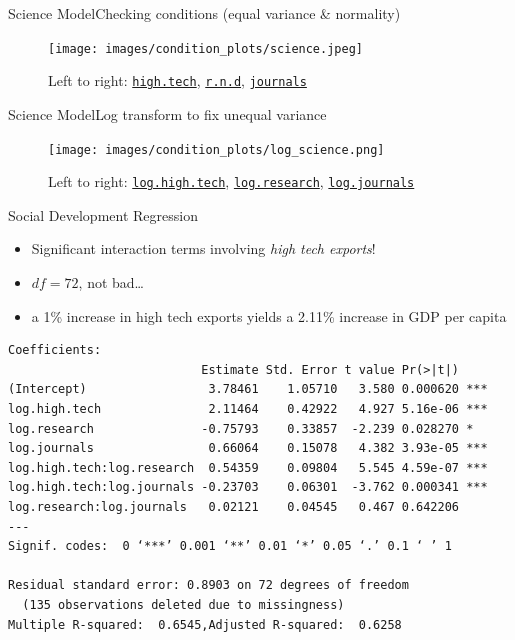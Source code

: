 \documentclass{beamer}
\begin{document}
\begin{frame}{{\sc Science} Model}{Checking conditions (equal variance \& normality)}
    \begin{figure}
      \centering
      \texttt{[image: images/condition\_plots/science.jpeg]}
      \caption{Left to right: \href{http://data.worldbank.org/indicator/TX.VAL.TECH.MF.ZS}{\tt high.tech}, \href{http://data.worldbank.org/indicator/GB.XPD.RSDV.GD.ZS}{\tt r.n.d}, \href{http://data.worldbank.org/indicator/IP.JRN.ARTC.SC}{\tt journals}}
    \end{figure}
\end{frame}

\begin{frame}{{\sc Science} Model}{Log transform to fix unequal variance}
    \begin{figure}
      \centering
      \texttt{[image: images/condition\_plots/log\_science.png]}
      \caption{Left to right: \href{http://data.worldbank.org/indicator/TX.VAL.TECH.MF.ZS}{\tt log.high.tech}, \href{http://data.worldbank.org/indicator/GB.XPD.RSDV.GD.ZS}{\tt log.research}, \href{http://data.worldbank.org/indicator/IP.JRN.ARTC.SC}{\tt log.journals}}
    \end{figure}
\end{frame}


\begin{frame}[fragile]{{\sc Social Development} Regression}
\small
\begin{itemize}
\item Significant interaction terms involving \emph{high tech exports}!
\item $df = 72$, not bad\dots
\item a 1\% increase in high tech exports yields a 2.11\% increase in GDP per capita
\end{itemize}
\begin{verbatim}
Coefficients:
                           Estimate Std. Error t value Pr(>|t|)    
(Intercept)                 3.78461    1.05710   3.580 0.000620 ***
log.high.tech               2.11464    0.42922   4.927 5.16e-06 ***
log.research               -0.75793    0.33857  -2.239 0.028270 *  
log.journals                0.66064    0.15078   4.382 3.93e-05 ***
log.high.tech:log.research  0.54359    0.09804   5.545 4.59e-07 ***
log.high.tech:log.journals -0.23703    0.06301  -3.762 0.000341 ***
log.research:log.journals   0.02121    0.04545   0.467 0.642206    
---
Signif. codes:  0 ‘***’ 0.001 ‘**’ 0.01 ‘*’ 0.05 ‘.’ 0.1 ‘ ’ 1

Residual standard error: 0.8903 on 72 degrees of freedom
  (135 observations deleted due to missingness)
Multiple R-squared:  0.6545,Adjusted R-squared:  0.6258
\end{verbatim}
\end{frame}
\end{document}
